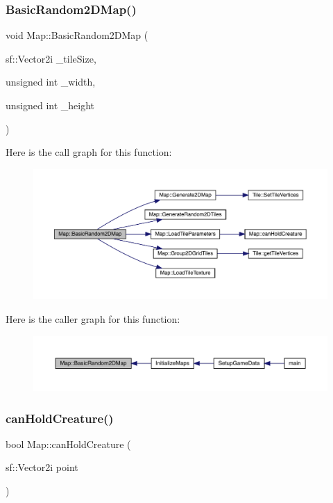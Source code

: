 \subsubsection{\texorpdfstring{Basic\+Random2\+D\+Map()}{BasicRandom2DMap()}}
{\footnotesize\ttfamily void Map\+::\+Basic\+Random2\+D\+Map (\begin{DoxyParamCaption}\item[{sf\+::\+Vector2i}]{\+\_\+tile\+Size,  }\item[{unsigned int}]{\+\_\+width,  }\item[{unsigned int}]{\+\_\+height }\end{DoxyParamCaption})}

Here is the call graph for this function\+:
\nopagebreak
\begin{figure}[H]
\begin{center}
\leavevmode
\includegraphics[width=350pt]{dd/d11/class_map_a1fabae1bed7d63177af112101c38c3b5_cgraph}
\end{center}
\end{figure}
Here is the caller graph for this function\+:
\nopagebreak
\begin{figure}[H]
\begin{center}
\leavevmode
\includegraphics[width=350pt]{dd/d11/class_map_a1fabae1bed7d63177af112101c38c3b5_icgraph}
\end{center}
\end{figure}
\mbox{\label{class_map_a2ee6fd8a412c966c941784b226374bd1}} 
\subsubsection{\texorpdfstring{can\+Hold\+Creature()}{canHoldCreature()}}
{\footnotesize\ttfamily bool Map\+::can\+Hold\+Creature (\begin{DoxyParamCaption}\item[{sf\+::\+Vector2i}]{point }\end{DoxyParamCaption})}

